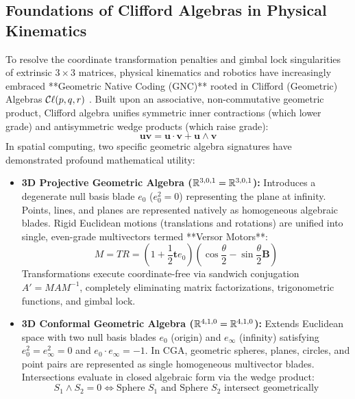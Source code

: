 \subsection{Foundations of Clifford Algebras in Physical Kinematics}
To resolve the coordinate transformation penalties and gimbal lock singularities of extrinsic $3 \times 3$ matrices, physical kinematics and robotics have increasingly embraced **Geometric Native Coding (GNC)** rooted in Clifford (Geometric) Algebras $\mathcal{C}\ell(p,q,r)$ \cite{dorst2009geometric}. Built upon an associative, non-commutative geometric product, Clifford algebra unifies symmetric inner contractions (which lower grade) and antisymmetric wedge products (which raise grade):
\begin{equation}
    \mathbf{u}\mathbf{v} = \mathbf{u} \cdot \mathbf{v} + \mathbf{u} \wedge \mathbf{v}
\end{equation}
In spatial computing, two specific geometric algebra signatures have demonstrated profound mathematical utility:
\begin{itemize}[leftmargin=1.2cm]
    \item \textbf{3D Projective Geometric Algebra ($\mathbb{R}^{3,0,1} = \mathbb{R}^{3,0,1}$):} Introduces a degenerate null basis blade $e_0$ ($e_0^2 = 0$) representing the plane at infinity. Points, lines, and planes are represented natively as homogeneous algebraic blades. Rigid Euclidean motions (translations and rotations) are unified into single, even-grade multivectors termed **Versor Motors**:
    \begin{equation}
        M = T R = \left( 1 + \frac{1}{2} \mathbf{t} e_0 \right) \left( \cos\frac{\theta}{2} - \sin\frac{\theta}{2} \mathbf{B} \right)
    \end{equation}
    Transformations execute coordinate-free via sandwich conjugation $A' = M A M^{-1}$, completely eliminating matrix factorizations, trigonometric functions, and gimbal lock.
    \item \textbf{3D Conformal Geometric Algebra ($\mathbb{R}^{4,1,0} = \mathbb{R}^{4,1,0}$):} Extends Euclidean space with two null basis blades $e_0$ (origin) and $e_\infty$ (infinity) satisfying $e_0^2 = e_\infty^2 = 0$ and $e_0 \cdot e_\infty = -1$. In CGA, geometric spheres, planes, circles, and point pairs are represented as single homogeneous multivector blades. Intersections evaluate in closed algebraic form via the wedge product:
    \begin{equation}
        S_1 \wedge S_2 = 0 \iff \text{Sphere } S_1 \text{ and Sphere } S_2 \text{ intersect geometrically}
    \end{equation}
\end{itemize}

